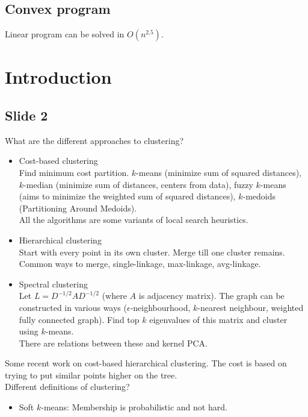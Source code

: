 \documentclass[12pt]{article}
\begin{document}
\subsection{Convex program}
Linear program can be solved in $O(n^{2.5})$.

\section{Introduction}
\subsection*{Slide 2}
What are the different approaches to clustering?
\begin{itemize}
	\item Cost-based clustering\\
	Find minimum cost partition. $k$-means (minimize sum of squared distances), $k$-median (minimize sum of distances, centers from data), fuzzy $k$-means (aims to minimize the weighted sum of squared distances), $k$-medoids (Partitioning Around Medoids). \\
	All the algorithms are some variants of local search heuristics.
	\item Hierarchical clustering\\
	Start with every point in its own cluster. Merge till one cluster remains. Common ways to merge, single-linkage, max-linkage, avg-linkage.
	\item Spectral clustering\\
	Let $L = D^{-1/2} A D^{-1/2}$ (where $A$ is adjacency matrix). The graph can be constructed in various ways ($\epsilon$-neighbourhood, $k$-nearest neighbour, weighted fully connected graph). Find top $k$ eigenvalues of this matrix and cluster using $k$-means.\\
	There are relations between these and kernel PCA.
\end{itemize}
Some recent work on cost-based hierarchical clustering. The cost is based on trying to put similar points higher on the tree.\\

\noindent Different definitions of clustering?
\begin{itemize}
	\item Soft $k$-means: Membership is probabilistic and not hard.
\end{itemize}
\end{document}
